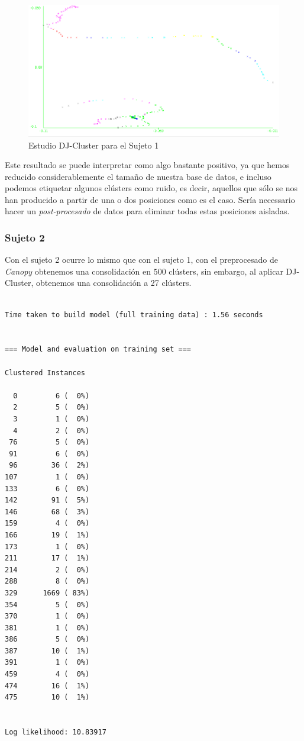 \documentclass[a4paper, 12pt]{article}
\begin{document}
\begin{figure}[H]
	\includegraphics[scale=.5]{../comparativa/djClusterSujeto1.png}
	\caption{Estudio DJ-Cluster para el Sujeto 1}
\end{figure}

Este resultado se puede interpretar como algo bastante positivo, ya que hemos reducido considerablemente el tama\~no de nuestra base de datos, e incluso podemos etiquetar algunos cl\'usters como ruido, es decir, aquellos que s\'olo se nos han producido a partir de una o dos posiciones como es el caso. Ser\'ia necessario hacer un \textit{post-procesado} de datos para eliminar todas estas posiciones aisladas.

\subsubsection{Sujeto 2}

Con el sujeto 2 ocurre lo mismo que con el sujeto 1, con el preprocesado de \textit{Canopy} obtenemos una consolidaci\'on en $500$ cl\'usters, sin embargo, al aplicar DJ-Cluster, obtenemos una consolidaci\'on a 27 cl\'usters.\\

\begin{verbatim}

Time taken to build model (full training data) : 1.56 seconds


=== Model and evaluation on training set ===

Clustered Instances

  0         6 (  0%)
  2         5 (  0%)
  3         1 (  0%)
  4         2 (  0%)
 76         5 (  0%)
 91         6 (  0%)
 96        36 (  2%)
107         1 (  0%)
133         6 (  0%)
142        91 (  5%)
146        68 (  3%)
159         4 (  0%)
166        19 (  1%)
173         1 (  0%)
211        17 (  1%)
214         2 (  0%)
288         8 (  0%)
329      1669 ( 83%)
354         5 (  0%)
370         1 (  0%)
381         1 (  0%)
386         5 (  0%)
387        10 (  1%)
391         1 (  0%)
459         4 (  0%)
474        16 (  1%)
475        10 (  1%)


Log likelihood: 10.83917
\end{verbatim}
\end{document}
